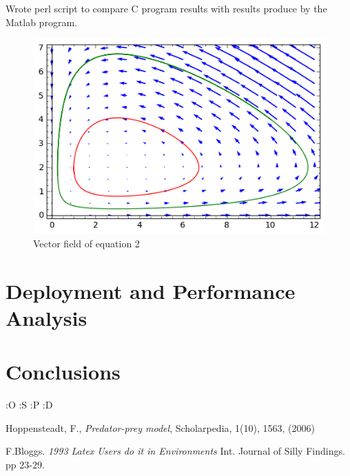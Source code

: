\documentclass[12pt,a4paper]{article}
\begin{document}

Wrote perl script to compare C program results with results produce by the Matlab program.

\begin{figure}[hb]
    \centering
    \includegraphics[scale=0.75]{images/sage1.png}
    \caption{Vector field of equation 2}
\end{figure}

\clearpage



\section{Deployment and Performance Analysis}




\section{Conclusions}

:O :S :P :D

\begin{thebibliography}{100}


 Hoppensteadt, F., \emph{Predator-prey model}, Scholarpedia, 1(10), 1563, (2006)

 F.Bloggs. {\em 1993 Latex Users do it
in Environments} Int. Journal of Silly Findings. pp 23-29.


\end{thebibliography}
\end{document}

